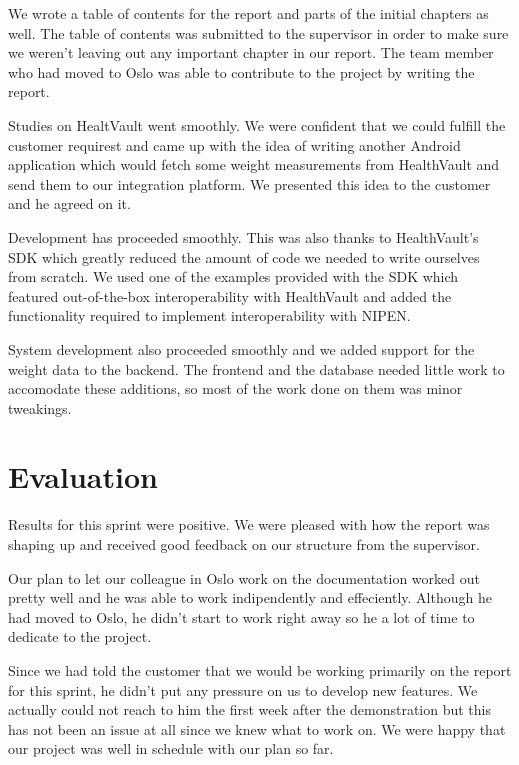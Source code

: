 We wrote a table of contents for the report and parts of the initial chapters as well.
The table of contents was submitted to the supervisor in order to make sure we weren't leaving out
any important chapter in our report. The team member who had moved to Oslo was able to contribute
to the project by writing the report.

Studies on HealtVault went smoothly. We were confident that we could fulfill the customer requirest
and came up with the idea of writing another Android application which would fetch some weight
measurements from HealthVault and send them to our integration platform.
We presented this idea to the customer and he agreed on it.

Development has proceeded smoothly. This was also thanks to HealthVault's SDK which greatly
reduced the amount of code we needed to write ourselves from scratch.
We used one of the examples provided with the SDK which featured out-of-the-box interoperability
with HealthVault and added the functionality required to implement interoperability with NIPEN.

System development also proceeded smoothly and we added support for the weight data to the backend.
The frontend and the database needed little work to accomodate these additions, so most of the work done on
them was minor tweakings.

\section{Evaluation}

Results for this sprint were positive. We were pleased with how the report was shaping up and
received good feedback on our structure from the supervisor.

Our plan to let our colleague in Oslo work on the documentation worked out pretty well
and he was able to work indipendently and effeciently. Although he had moved to Oslo,
he didn't start to work right away so he a lot of time to dedicate to the project.

Since we had told the customer that we would be working primarily on the report for this sprint,
he didn't put any pressure on us to develop new features. We actually could not reach to him
the first week after the demonstration but this has not been an issue at all since we
knew what to work on. We were happy that our project was well in schedule with our plan so far.

